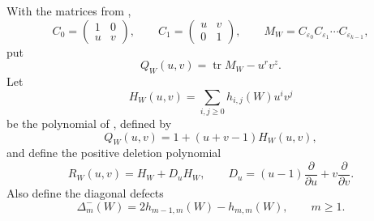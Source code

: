 \documentclass[10pt,a4paper]{article}
\begin{document}
With the matrices from \cite[Sections 2--3]{Proof},
\[
 C_0=\begin{pmatrix}1&0\\ u&v\end{pmatrix},\qquad
 C_1=\begin{pmatrix}u&v\\ 0&1\end{pmatrix},\qquad
 M_W=C_{\varepsilon_0}C_{\varepsilon_1}\cdots C_{\varepsilon_{k-1}},
\]
put
\[
 Q_W(u,v)=\operatorname{tr}M_W-u^rv^z.
\]
Let
\[
 H_W(u,v)=\sum_{i,j\geq0}h_{i,j}(W)u^iv^j
\]
be the polynomial of \cite[equation (10)]{Proof}, defined by
\[
 Q_W(u,v)=1+(u+v-1)H_W(u,v),                                \tag{3}
\]
and define the positive deletion polynomial
\[
 R_W(u,v)=H_W+D_uH_W,
 \qquad
 D_u=(u-1)\frac{\partial}{\partial u}
                  +v\frac{\partial}{\partial v}.            \tag{4}
\]
Also define the diagonal defects
\[
 \Delta_m^-(W)=2h_{m-1,m}(W)-h_{m,m}(W),
 \qquad m\geq1.                                             \tag{5}
\]
\end{document}
